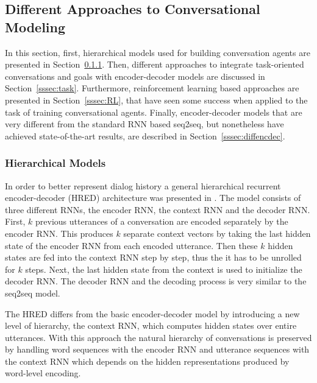 \documentclass[12pt]{article}
\begin{document}
\subsection{Different Approaches to Conversational Modeling} \label{ssec:33}
In this section, first, hierarchical models used for building conversation agents are presented in Section~\ref{sssec:HRED}. Then, different approaches to integrate task-oriented conversations and goals with encoder-decoder models are discussed in Section~\ref{sssec:task}. Furthermore, reinforcement learning based approaches are presented in Section~\ref{sssec:RL}, that have seen some success when applied to the task of training conversational agents. Finally, encoder-decoder models that are very different from the standard RNN based seq2seq, but nonetheless have achieved state-of-the-art results, are described in Section~\ref{sssec:diffencdec}.

\subsubsection{Hierarchical Models} \label{sssec:HRED}
In order to better represent dialog history a general hierarchical recurrent encoder-decoder (HRED) architecture was presented in \cite{Serban:2015}. The model consists of three different RNNs, the encoder RNN, the context RNN and the decoder RNN. First, \(k\) previous utterances of a conversation are encoded separately by the encoder RNN. This produces \(k\) separate context vectors by taking the last hidden state of the encoder RNN from each encoded utterance. Then these \(k\) hidden states are fed into the context RNN step by step, thus the it has to be unrolled for \(k\) steps. Next, the last hidden state from the context is used to initialize the decoder RNN. The decoder RNN and the decoding process is very similar to the seq2seq model.

The HRED differs from the basic encoder-decoder model by introducing a new level of hierarchy, the context RNN, which computes hidden states over entire utterances. With this approach the natural hierarchy of conversations is preserved by handling word sequences with the encoder RNN and utterance sequences with the context RNN which depends on the hidden representations produced by word-level encoding.
\end{document}
